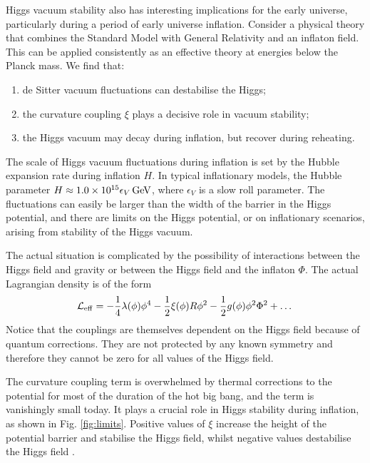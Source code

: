 \documentclass{PoS}
\begin{document}
Higgs vacuum stability also has interesting implications for the early universe,
particularly during a period of early universe inflation. Consider a physical
theory that combines the Standard Model with General Relativity and an
inflaton field. This can be applied consistently as an effective theory
at energies below the Planck mass. We find that:



\begin{enumerate}
\item de Sitter vacuum fluctuations can destabilise the Higgs;
\item the curvature coupling $\xi$ plays a decisive role in vacuum stability;
\item the Higgs vacuum may decay during inflation, but recover during reheating.
\end{enumerate}

The scale of Higgs vacuum fluctuations during inflation is set by the Hubble expansion rate
during inflation $H$. In typical inflationary models, the Hubble parameter 
$H\approx 1.0\times10^{15}\epsilon_V\,{\rm GeV}$, where $\epsilon_V$ is a slow roll 
parameter. The fluctuations can easily be larger than the width of the
barrier in the Higgs potential, and there are limits on the Higgs potential,
or on inflationary scenarios, arising from stability of the Higgs vacuum.

The actual situation is complicated by the possibility of interactions between the
Higgs field and gravity or between the Higgs field and the inflaton $\Phi$. The
actual Lagrangian density is of the form
\begin{equation}
{\cal L}_{\rm eff}=-\frac14\lambda(\phi)\phi^4-\frac12\xi(\phi)R\phi^2-\frac12g(\phi)\phi^2\Phi^2+\dots
\end{equation}
Notice that the couplings are themselves dependent on the Higgs field because
of quantum corrections. They are not protected by any known symmetry and therefore
they cannot be zero for all values of the Higgs field. 

The curvature coupling term  is overwhelmed by thermal corrections to the potential for most 
of the duration of the hot big bang, and the term is vanishingly small today. It plays
a crucial role in Higgs stability during inflation, as shown in Fig. \ref{fig:limits}. Positive values of $\xi$
increase the height of the potential barrier and stabilise the Higgs field, whilst
negative values destabilise the Higgs field \cite{Espinosa:2007qp}.
\end{document}
